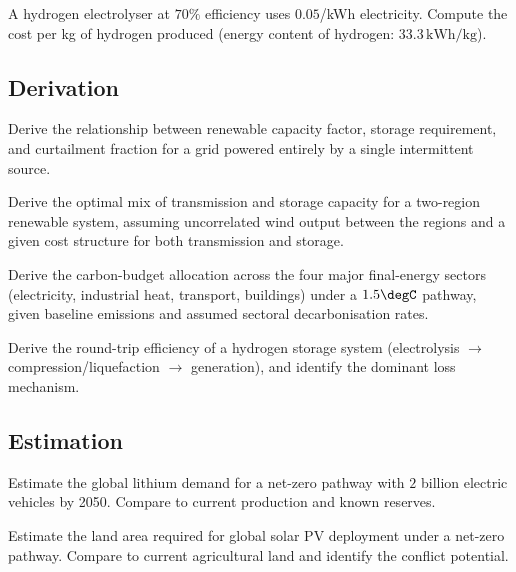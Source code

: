 \begin{exercise}
A hydrogen electrolyser at $70\%$ efficiency uses $0.05$/kWh electricity. Compute the cost per kg of hydrogen produced (energy content of hydrogen: $33.3\,\text{kWh/kg}$).
\end{exercise}

\subsection*{Derivation}

\begin{exercise}
Derive the relationship between renewable capacity factor, storage requirement, and curtailment fraction for a grid powered entirely by a single intermittent source.
\end{exercise}

\begin{exercise}
Derive the optimal mix of transmission and storage capacity for a two-region renewable system, assuming uncorrelated wind output between the regions and a given cost structure for both transmission and storage.
\end{exercise}

\begin{exercise}
Derive the carbon-budget allocation across the four major final-energy sectors (electricity, industrial heat, transport, buildings) under a $1.5\degC$ pathway, given baseline emissions and assumed sectoral decarbonisation rates.
\end{exercise}

\begin{exercise}
Derive the round-trip efficiency of a hydrogen storage system (electrolysis $\to$ compression/liquefaction $\to$ generation), and identify the dominant loss mechanism.
\end{exercise}

\subsection*{Estimation}

\begin{exercise}
Estimate the global lithium demand for a net-zero pathway with $2$ billion electric vehicles by 2050. Compare to current production and known reserves.
\end{exercise}

\begin{exercise}
Estimate the land area required for global solar PV deployment under a net-zero pathway. Compare to current agricultural land and identify the conflict potential.
\end{exercise}

